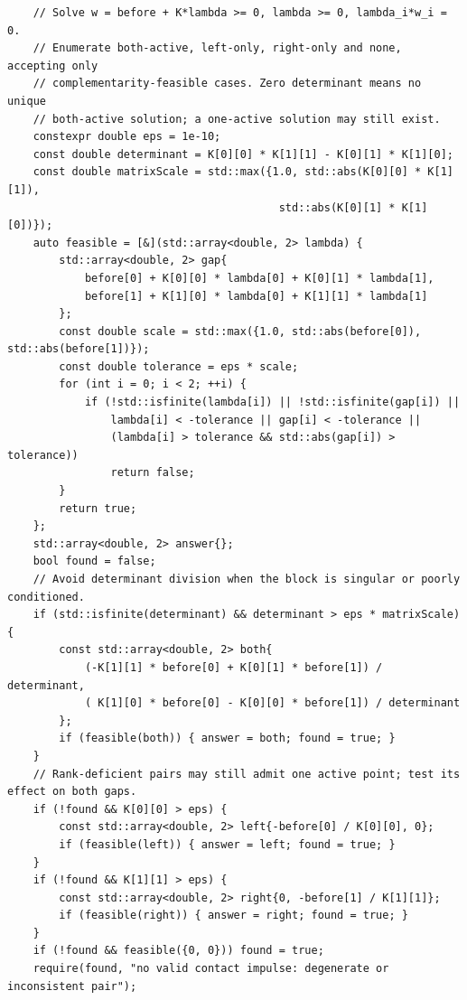 \begin{verbatim}
    // Solve w = before + K*lambda >= 0, lambda >= 0, lambda_i*w_i = 0.
    // Enumerate both-active, left-only, right-only and none, accepting only
    // complementarity-feasible cases. Zero determinant means no unique
    // both-active solution; a one-active solution may still exist.
    constexpr double eps = 1e-10;
    const double determinant = K[0][0] * K[1][1] - K[0][1] * K[1][0];
    const double matrixScale = std::max({1.0, std::abs(K[0][0] * K[1][1]),
                                          std::abs(K[0][1] * K[1][0])});
    auto feasible = [&](std::array<double, 2> lambda) {
        std::array<double, 2> gap{
            before[0] + K[0][0] * lambda[0] + K[0][1] * lambda[1],
            before[1] + K[1][0] * lambda[0] + K[1][1] * lambda[1]
        };
        const double scale = std::max({1.0, std::abs(before[0]), std::abs(before[1])});
        const double tolerance = eps * scale;
        for (int i = 0; i < 2; ++i) {
            if (!std::isfinite(lambda[i]) || !std::isfinite(gap[i]) ||
                lambda[i] < -tolerance || gap[i] < -tolerance ||
                (lambda[i] > tolerance && std::abs(gap[i]) > tolerance))
                return false;
        }
        return true;
    };
    std::array<double, 2> answer{};
    bool found = false;
    // Avoid determinant division when the block is singular or poorly conditioned.
    if (std::isfinite(determinant) && determinant > eps * matrixScale) {
        const std::array<double, 2> both{
            (-K[1][1] * before[0] + K[0][1] * before[1]) / determinant,
            ( K[1][0] * before[0] - K[0][0] * before[1]) / determinant
        };
        if (feasible(both)) { answer = both; found = true; }
    }
    // Rank-deficient pairs may still admit one active point; test its effect on both gaps.
    if (!found && K[0][0] > eps) {
        const std::array<double, 2> left{-before[0] / K[0][0], 0};
        if (feasible(left)) { answer = left; found = true; }
    }
    if (!found && K[1][1] > eps) {
        const std::array<double, 2> right{0, -before[1] / K[1][1]};
        if (feasible(right)) { answer = right; found = true; }
    }
    if (!found && feasible({0, 0})) found = true;
    require(found, "no valid contact impulse: degenerate or inconsistent pair");


\end{verbatim}
